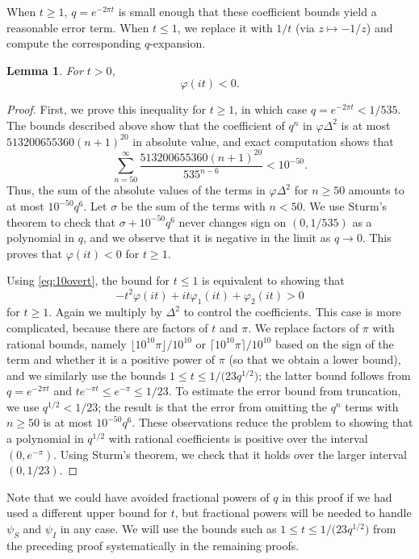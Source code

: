 \documentclass{aomart}
\theoremstyle{plain}
\newtheorem{lemma}[theorem]{Lemma}
\numberwithin{theorem}{section}
\numberwithin{equation}{section}
\begin{document}
When $t \ge 1$, $q = e^{-2\pi t}$ is small enough that these coefficient
bounds yield a reasonable error term.  When $t \le 1$, we replace it with
$1/t$ (via $z \mapsto -1/z$) and compute the corresponding $q$-expansion.

\begin{lemma} \label{lemma:phinonpos}
For $t > 0$,
\[
\varphi(it) < 0.
\]
\end{lemma}

\begin{proof}
First, we prove this inequality for $t \ge 1$, in which case $q = e^{-2\pi
t} < 1/535$. The bounds described above show that the coefficient of $q^n$
in $\varphi\Delta^2$ is at most $513200655360(n+1)^{20}$ in absolute value,
and exact computation shows that
\[
\sum_{n = 50}^\infty \frac{513200655360(n+1)^{20}}{535^{n-6}} < 10^{-50}.
\]
Thus, the sum of the absolute values of the terms in $\varphi\Delta^2$ for
$n \ge 50$ amounts to at most $10^{-50} q^6$. Let $\sigma$ be the sum of the
terms with $n<50$. We use Sturm's theorem to check that $\sigma + 10^{-50}
q^6$ never changes sign on $(0,1/535)$ as a polynomial in $q$, and we
observe that it is negative in the limit as $q \to 0$.  This proves that
$\varphi(it) < 0$ for $t \ge 1$.

Using \eqref{eq:10overt}, the bound for $t \le 1$ is equivalent to showing
that
\[
-t^2 \varphi(it) + i t \varphi_1(it) + \varphi_2(it) > 0
\]
for $t \ge 1$. Again we multiply by $\Delta^2$ to control the coefficients.
This case is more complicated, because there are factors of $t$ and $\pi$. We
replace factors of $\pi$ with rational bounds, namely $\lfloor
10^{10}\pi\rfloor/10^{10}$ or $\lceil 10^{10}\pi\rceil/10^{10}$ based on the
sign of the term and whether it is a positive power of $\pi$ (so that we
obtain a lower bound), and we similarly use the bounds $1 \le t \le 1/\big(23
q^{1/2}\big)$; the latter bound follows from $q = e^{-2\pi t}$ and $te^{-\pi
t} \le e^{-\pi} \le 1/23$. To estimate the error bound from truncation, we
use $q^{1/2} < 1/23$; the result is that the error from omitting the $q^n$
terms with $n \ge 50$ is at most $10^{-50} q^6$. These observations reduce
the problem to showing that a polynomial in $q^{1/2}$ with rational
coefficients is positive over the interval $(0,e^{-\pi})$. Using Sturm's
theorem, we check that it holds over the larger interval $(0,1/23)$.
\end{proof}

Note that we could have avoided fractional powers of $q$ in this proof if we
had used a different upper bound for $t$, but fractional powers will be
needed to handle $\psi_S$ and $\psi_I$ in any case.  We will use the bounds
such as $1 \le t \le 1/\big(23 q^{1/2}\big)$ from the preceding proof
systematically in the remaining proofs.
\end{document}
